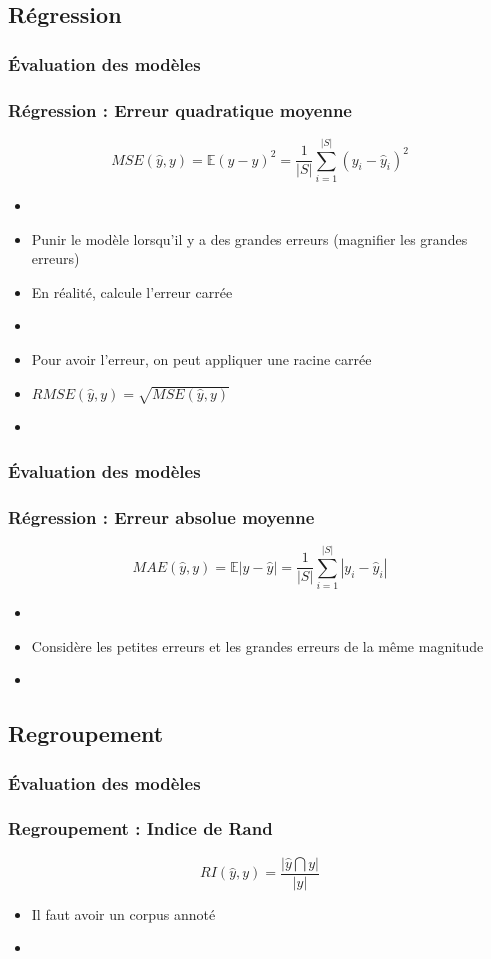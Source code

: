 \documentclass[xcolor=table]{beamer}
\begin{document}
\subsection{Régression}

\begin{frame}
	\frametitle{Évaluation des modèles}
	\frametitle{Régression : Erreur quadratique moyenne}
	
	\[MSE(\hat{y}, y) = \mathbb{E}(y - \hat{y})^2 =  \frac{1}{|S|} \sum_{i=1}^{|S|} (y_i - \hat{y}_i)^2\]
	
	\begin{itemize}
		\item {}
		\item Punir le modèle lorsqu'il y a des grandes erreurs (magnifier les grandes erreurs)
		\item En réalité, calcule l'erreur carrée
		\item {}
		\item Pour avoir l'erreur, on peut appliquer une racine carrée
		\item $RMSE(\hat{y}, y) = \sqrt{MSE(\hat{y}, y)}$
		\item {}
	\end{itemize}
	
\end{frame}

\begin{frame}
	\frametitle{Évaluation des modèles}
	\frametitle{Régression : Erreur absolue moyenne}
	
	\[MAE(\hat{y}, y) = \mathbb{E}|y - \hat{y}| =  \frac{1}{|S|} \sum_{i=1}^{|S|} |y_i - \hat{y}_i|\]
	
	\begin{itemize}
		\item {}
		\item Considère les petites erreurs et les grandes erreurs de la même magnitude
		\item {}
	\end{itemize}
	
\end{frame}

\subsection{Regroupement}

\begin{frame}
	\frametitle{Évaluation des modèles}
	\frametitle{Regroupement : Indice de Rand}
	
	\[RI(\hat{y}, y) = \frac{|\hat{y} \bigcap y|}{|y|}\]
	
	\begin{itemize}
		\item Il faut avoir un corpus annoté
		\item {}
	\end{itemize}
	
\end{frame}
\end{document}
